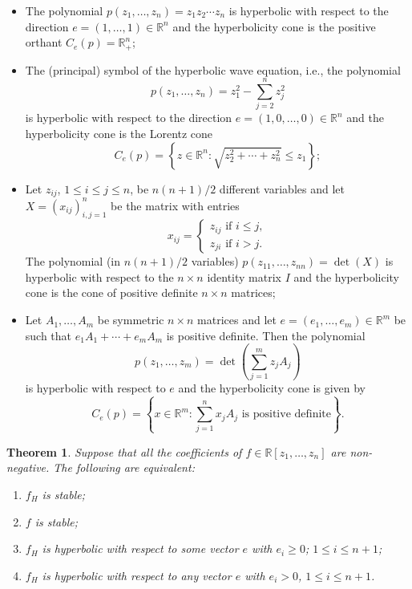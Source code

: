 \documentclass[10pt,reqno]{amsart}
\theoremstyle{plain}
\newtheorem{theorem}{Theorem}[section]
\theoremstyle{definition}
\theoremstyle{remark}
\newcommand{\RR}{\mathbb{R}}
\begin{document}
\begin{itemize}
\item[(I)] The polynomial $p(z_1,\ldots,z_n)= z_1z_2\cdots z_n$ is hyperbolic 
with respect to the direction $e=(1,\ldots,1)\in\RR^n$ and the hyperbolicity 
cone is the positive orthant $C_e(p)=\RR_+^n$; 
\item[(II)] The (principal) symbol of the hyperbolic wave equation, i.e., 
the polynomial 
$$
p(z_1,\ldots, z_n) = z_1^2-\sum_{j=2}^n z_j^2
$$
is hyperbolic with respect to the direction $e=(1,0,\ldots,0)\in\RR^n$ and 
the hyperbolicity cone is the Lorentz cone 
$$
C_e(p)=\left\{z \in \RR^n : \sqrt{z_2^2+\cdots+z_n^2} \leq z_1\right\};
$$
\item[(III)] Let $z_{ij}$, $1\le i\le j\le n$, be $n(n+1)/2$ different 
variables and let $X=(x_{ij})_{i,j=1}^n$  be the matrix with entries 
$$
x_{ij} = \begin{cases} 
z_{ij} \mbox{ if } i \leq j, \\
z_{ji} \mbox{ if } i > j.
\end{cases} 
$$
The polynomial (in $n(n+1)/2$ variables) 
$p(z_{11}, \ldots, z_{nn}) = \det(X)$ is  hyperbolic with respect to the
$n\times n$ identity matrix $I$ and the hyperbolicity cone is the cone of 
positive definite $n\times n$ matrices; 
\item[(IV)] Let $A_1, \ldots, A_m$ be symmetric $n \times n$ matrices and let 
$e=(e_1,\ldots,e_m) \in \RR^m$ be such that  $e_1A_1 + \cdots+e_mA_m$ is 
positive definite. Then the polynomial 
$$
p(z_1,\ldots, z_m) = \det\left(\sum_{j=1}^m z_jA_j\right)
$$
is hyperbolic with respect to $e$ and the hyperbolicity cone is given by 
$$
C_e(p)= \left\{ x \in \RR^m : \sum_{j=1}^n x_jA_j \mbox{ is positive 
definite}\right\}.
$$   
\end{itemize}

\begin{theorem}\label{homhom}
Suppose that all the coefficients of $f \in \RR[z_1,\ldots, z_n]$ are 
non-negative. The following are equivalent:
\begin{enumerate} 
\item $f_H$ is stable; 
\item $f$ is stable; 
\item $f_H$ is hyperbolic with respect to some vector $e$ with $e_i\geq 0$; 
$1 \leq i \leq n+1$;
\item $f_H$ is hyperbolic with respect to any vector $e$ with $e_i>0$, 
$1 \leq i \leq n+1$. 
\end{enumerate}
\end{theorem}
\end{document}
